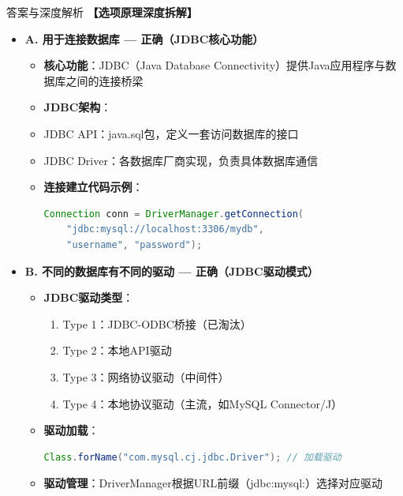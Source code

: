 \documentclass[12pt, a4paper]{ctexart}
\begin{document}
\begin{enumerate}[label=\textbf{\arabic*.}]
\begin{bluebox}{答案与深度解析}
		      \textbf{【选项原理深度拆解】}
					  \begin{itemize}[label={}, leftmargin=*, nosep]
		      \item \textbf{A. 用于连接数据库 — 正确（JDBC核心功能）}
					  \begin{itemize}[label={}, nosep]
			      \item \textbf{核心功能}：JDBC（Java Database Connectivity）提供Java应用程序与数据库之间的连接桥梁
			      \item \textbf{JDBC架构}：
				            \item JDBC API：java.sql包，定义一套访问数据库的接口
				            \item JDBC Driver：各数据库厂商实现，负责具体数据库通信
			      \item \textbf{连接建立代码示例}：
			            \begin{lstlisting}[language=Java]
Connection conn = DriverManager.getConnection(
    "jdbc:mysql://localhost:3306/mydb",
    "username", "password");
      \end{lstlisting}
					  \end{itemize}
		      \item \textbf{B. 不同的数据库有不同的驱动 — 正确（JDBC驱动模式）}
					  \begin{itemize}[label={}, nosep]
			      \item \textbf{JDBC驱动类型}：
			            \begin{enumerate}
				            \item Type 1：JDBC-ODBC桥接（已淘汰）
				            \item Type 2：本地API驱动
				            \item Type 3：网络协议驱动（中间件）
				            \item Type 4：本地协议驱动（主流，如MySQL Connector/J）
			            \end{enumerate}
			      \item \textbf{驱动加载}：
			            \begin{lstlisting}[language=Java]
Class.forName("com.mysql.cj.jdbc.Driver"); // 加载驱动
      \end{lstlisting}
			      \item \textbf{驱动管理}：DriverManager根据URL前缀（jdbc:mysql:）选择对应驱动
					  \end{itemize}

\end{itemize}
\end{bluebox}
\end{enumerate}
\end{document}
